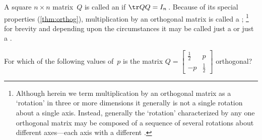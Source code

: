\begin{definition} \label{def:orthog} 
A square \(n\times n\) matrix~\(Q\) is called an  if \(\tr QQ=I_n\)\,.
Because of its special properties (\cref{thm:orthog}),
multiplication by an orthogonal matrix is called a ;%
\footnote{Although herein we term multiplication by an orthogonal matrix as a `rotation' in three or more dimensions it generally is not a single rotation about a single axis.  
Instead, generally the `rotation' characterized by any one orthogonal matrix may be composed of a sequence of several rotations about different axes---each axis with a different .}
for brevity and depending upon the circumstances it may be called just a  or just a .
\end{definition}




\begin{activity}
For which of the following values of~\(p\) is the matrix \(Q=\begin{bmatrix} \frac12&p\\-p&\frac12 \end{bmatrix}\) orthogonal?
\end{activity}


